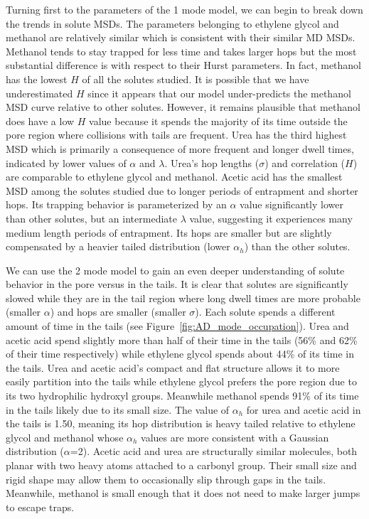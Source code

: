 \documentclass[12pt]{article}
\begin{document}
  Turning first to the parameters of the 1 mode model, we can begin to break down the
  trends in solute MSDs. The parameters belonging to ethylene glycol and methanol are
  relatively similar which is consistent with their similar MD MSDs. Methanol 
  tends to stay trapped for less time and takes larger hops but the most substantial
  difference is with respect to their Hurst parameters. In fact, methanol has the lowest
  $H$ of all the solutes studied. It is possible that we have underestimated $H$ since 
  it appears that our model under-predicts the methanol MSD curve relative
  to other solutes. However, it remains plausible that methanol does have a low $H$ 
  value because it spends the majority of its time outside the pore region where collisions
  with tails are frequent. Urea has the third highest MSD which is primarily a consequence of
  more frequent and longer dwell times, indicated by lower values of $\alpha$ and 
  $\lambda$. Urea's hop lengths ($\sigma$) and correlation ($H$) are comparable to ethylene
  glycol and methanol. Acetic acid has the smallest MSD among the solutes studied due 
  to longer periods of entrapment and shorter hops. Its trapping behavior is parameterized
  by an $\alpha$ value significantly lower than other solutes, but an intermediate 
  $\lambda$ value, suggesting it experiences many medium length periods of entrapment. 
  Its hops are smaller but are slightly compensated by a heavier tailed distribution 
  (lower $\alpha_h$) than the other solutes. 
  
  We can use the 2 mode model to gain an even deeper understanding of solute behavior
  in the pore versus in the tails. It is clear that solutes are significantly slowed 
  while they are in the tail region where long dwell times are more probable
  (smaller $\alpha$) and hops are smaller (smaller $\sigma$). Each solute spends 
  a different amount of time in the tails (see Figure~\ref{fig:AD_mode_occupation}). 
  Urea and acetic acid spend slightly more than half of their time in the tails 
  (56\% and 62\% of their time respectively) while ethylene glycol spends about 
  44\% of its time in the tails. Urea and acetic acid's compact and flat structure 
  allows it to more easily partition into the tails while ethylene glycol prefers
  the pore region due to its two hydrophilic hydroxyl groups. Meanwhile methanol 
  spends 91\% of its time in the tails likely due to its small size.  
  The value of $\alpha_h$ for urea and acetic acid in the tails is 1.50, meaning its hop distribution
  is heavy tailed relative to ethylene glycol and methanol whose $\alpha_h$ values are
  more consistent with a Gaussian distribution ($\alpha$=2). Acetic acid and urea are
  structurally similar molecules, both planar with two heavy atoms attached to a 
  carbonyl group. Their small size and rigid shape may allow them to occasionally slip
  through gaps in the tails. Meanwhile, methanol is small enough that it does not need
  to make larger jumps to escape traps.
  
\end{document}
